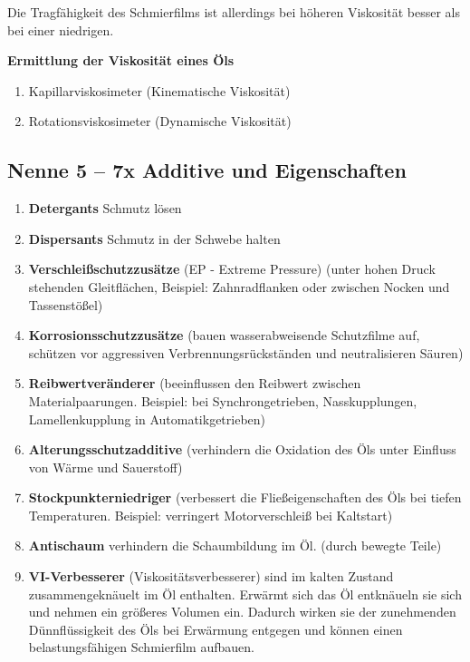Die Tragfähigkeit des Schmierfilms ist allerdings bei höheren Viskosität
besser als bei einer niedrigen.

\textbf{Ermittlung der Viskosität eines Öls}

\begin{enumerate}
\item
  Kapillarviskosimeter (Kinematische Viskosität)
\item
  Rotationsviskosimeter (Dynamische Viskosität)
\end{enumerate}

\subsection{Nenne 5 -- 7x Additive und
Eigenschaften}\label{nenne-5-7x-additive-und-eigenschaften}

\begin{enumerate}
\item
  \textbf{Detergants} Schmutz lösen
\item
  \textbf{Dispersants} Schmutz in der Schwebe halten
\item
  \textbf{Verschleißschutzzusätze} (EP - Extreme Pressure) (unter hohen
  Druck stehenden Gleitflächen, Beispiel: Zahnradflanken oder zwischen
  Nocken und Tassenstößel)
\item
  \textbf{Korrosionsschutzzusätze} (bauen wasserabweisende Schutzfilme
  auf, schützen vor aggressiven Verbrennungsrückständen und
  neutralisieren Säuren)
\item
  \textbf{Reibwertveränderer} (beeinflussen den Reibwert zwischen
  Materialpaarungen. Beispiel: bei Synchrongetrieben, Nasskupplungen,
  Lamellenkupplung in Automatikgetrieben)
\item
  \textbf{Alterungsschutzadditive} (verhindern die Oxidation des Öls
  unter Einfluss von Wärme und Sauerstoff)
\item
  \textbf{Stockpunkterniedriger} (verbessert die Fließeigenschaften des
  Öls bei tiefen Temperaturen. Beispiel: verringert Motorverschleiß bei
  Kaltstart)
\item
  \textbf{Antischaum} verhindern die Schaumbildung im Öl. (durch bewegte
  Teile)
\item
  \textbf{VI-Verbesserer} (Viskositätsverbesserer) sind im kalten
  Zustand zusammengeknäuelt im Öl enthalten. Erwärmt sich das Öl
  entknäueln sie sich und nehmen ein größeres Volumen ein. Dadurch
  wirken sie der zunehmenden Dünnflüssigkeit des Öls bei Erwärmung
  entgegen und können einen belastungsfähigen Schmierfilm aufbauen.
\end{enumerate}

